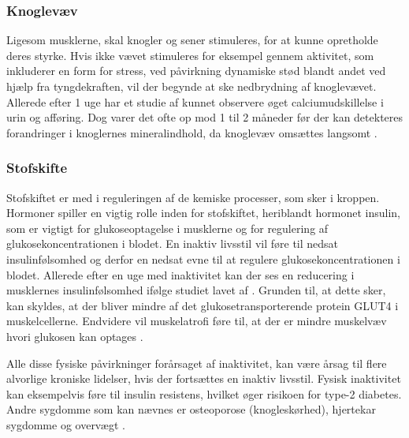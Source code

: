 \subsubsection{Knoglevæv}
Ligesom musklerne, skal knogler og sener stimuleres, for at kunne opretholde deres styrke. 
Hvis ikke vævet stimuleres for eksempel gennem aktivitet, som inkluderer en form for stress, ved påvirkning dynamiske stød blandt andet ved hjælp fra tyngdekraften, vil der begynde at ske nedbrydning af knoglevævet. 
Allerede efter 1 uge har et studie af \citeauthor{Bloomfield1995} kunnet observere øget calciumudskillelse i urin og afføring. 
Dog varer det ofte op mod 1 til 2 måneder før der kan detekteres forandringer i knoglernes mineralindhold, da knoglevæv omsættes langsomt \citep{Bloomfield1995}.

\subsubsection{Stofskifte}
Stofskiftet er med i reguleringen af de kemiske processer, som sker i kroppen. 
Hormoner spiller en vigtig rolle inden for stofskiftet, heriblandt hormonet insulin, som er vigtigt for glukoseoptagelse i musklerne og for regulering af glukosekoncentrationen i blodet. 
En inaktiv livsstil vil føre til nedsat insulinfølsomhed og derfor en nedsat evne til at regulere glukosekoncentrationen i blodet. 
Allerede efter en uge med inaktivitet kan der ses en reducering i musklernes insulinfølsomhed ifølge studiet lavet af \citeauthor{Mikines1991}. 
Grunden til, at dette sker, kan skyldes, at der bliver mindre af det glukosetransporterende protein GLUT4 i muskelcellerne. 
Endvidere vil muskelatrofi føre til, at der er mindre muskelvæv hvori glukosen kan optages \citep{Tabata1999}.

\noindent
Alle disse fysiske påvirkninger forårsaget af inaktivitet, kan være årsag til flere alvorlige kroniske lidelser, hvis der fortsættes en inaktiv livsstil. 
Fysisk inaktivitet kan eksempelvis føre til insulin resistens, hvilket øger risikoen for type-2 diabetes. 
Andre sygdomme som kan nævnes er osteoporose (knogleskørhed), hjertekar sygdomme og overvægt \citep{motionsraad2007}.